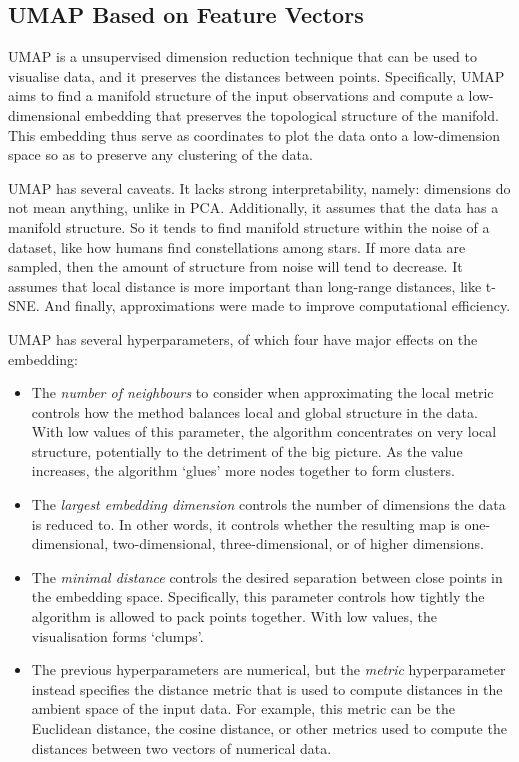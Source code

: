\subsection{UMAP Based on Feature Vectors}
\label{subsec:analysis-clustering-umap}

UMAP \parencite{mcinnesUMAPUniformManifold2020} is a unsupervised dimension reduction technique that can be used to visualise data, and it preserves the distances between points.
Specifically, UMAP aims to find a manifold structure of the input observations and compute a low-dimensional embedding that preserves the topological structure of the manifold.
This embedding thus serve as coordinates to plot the data onto a low-dimension space so as to preserve any clustering of the data.

UMAP has several caveats.
It lacks strong interpretability, namely: dimensions do not mean anything, unlike in PCA.
Additionally, it assumes that the data has a manifold structure.
So it tends to find manifold structure within the noise of a dataset, like how humans find constellations among stars.
If more data are sampled, then the amount of structure from noise will tend to decrease.
It assumes that local distance is more important than long-range distances, like t-SNE.
And finally, approximations were made to improve computational efficiency.

UMAP has several hyperparameters, of which four have major effects on the embedding:
\begin{itemize}
  \item The \emph{number of neighbours} to consider when approximating the local metric controls how the method balances local and global structure in the data.
        With low values of this parameter, the algorithm concentrates on very local structure, potentially to the detriment of the big picture.
        As the value increases, the algorithm `glues' more nodes together to form clusters.
  \item The \emph{largest embedding dimension} controls the number of dimensions the data is reduced to.
        In other words, it controls whether the resulting map is one-dimensional, two-dimensional, three-dimensional, or of higher dimensions.
  \item The \emph{minimal distance} controls the desired separation between close points in the embedding space.
        Specifically, this parameter controls how tightly the algorithm is allowed to pack points together.
        With low values, the visualisation forms `clumps'.
  \item The previous hyperparameters are numerical, but the \emph{metric} hyperparameter instead specifies the distance metric that is used to compute distances in the ambient space of the input data.
        For example, this metric can be the Euclidean distance, the cosine distance, or other metrics used to compute the distances between two vectors of numerical data.
\end{itemize}

